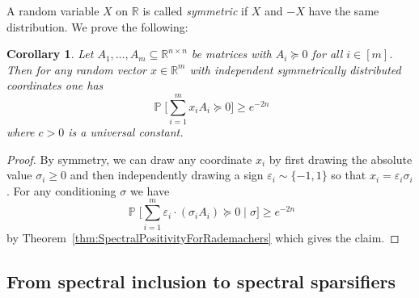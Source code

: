 \documentclass[12pt,english]{article}
\theoremstyle{theorem}
\newtheorem{corollary}[theorem]{Corollary}
\theoremstyle{remark}
\providecommand{\setR}{\mathbb{R}}
\newcommand{\E}{\mathop{\mathbb{E}}}
\renewcommand{\Pr}{\mathop{\mathbb{P}}}
\begin{document}
A random variable $X$ on $\setR$ is called \emph{symmetric} if $X$ and $-X$ have the same distribution.
We prove the following:

\begin{corollary} \label{cor:SpectralPositivityForSymDist}
  Let $A_1,\ldots,A_m \subseteq \setR^{n \times n}$ be matrices with $A_i \succeq 0$ for all $i \in [m]$. Then
  for any random vector $x \in \setR^m$ with independent symmetrically distributed coordinates one has
  \[
 \Pr\Big[\sum_{i=1}^m x_iA_i \succeq 0\Big] \geq e^{-2n}
  \]
  where $c>0$ is a universal constant.
\end{corollary}
\begin{proof}
By symmetry, we can draw any coordinate $x_i$ by first drawing the absolute value $\sigma_i \geq 0$ and then independently drawing a sign $\varepsilon_i \sim \{ -1,1\}$ so that $x_i = \varepsilon_i\sigma_i$. For any conditioning $\sigma$ we have
\[
 \Pr\Big[\sum_{i=1}^m \varepsilon_i \cdot (\sigma_iA_i) \succeq 0 \mid \sigma \Big] \geq e^{-2n}
\]
by Theorem~\ref{thm:SpectralPositivityForRademachers} which gives the claim.
\end{proof}


\subsection{From spectral inclusion to spectral sparsifiers}
\end{document}
